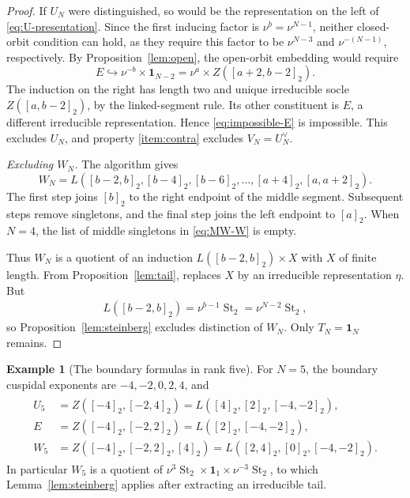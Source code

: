 \documentclass[11pt,leqno]{amsart}
\numberwithin{equation}{section}
\theoremstyle{plain}
\theoremstyle{definition}
\newtheorem{example}[theorem]{Example}
\theoremstyle{remark}
\DeclareMathOperator{\St}{St}
\newcommand{\one}{\mathbf{1}}
\newcommand{\into}{\hookrightarrow}
\newcommand{\seg}[2]{[#1,#2]_2}
\newcommand{\sg}[1]{[#1]_2}
\begin{document}
\begin{proof}
		If $U_N$ were distinguished, so would be the representation on
		the left of \eqref{eq:U-presentation}. 
		Since the first inducing factor is $\nu^b=\nu^{N-1}$,
		neither closed-orbit condition can hold, as they require this
		factor to be $\nu^{N-3}$ and $\nu^{-(N-1)}$, respectively.
		By Proposition~\ref{lem:open}, the open-orbit embedding would require
		\begin{equation}\label{eq:impossible-E}
			E\into\nu^{-b}\times\one_{N-2}
			=\nu^a\times Z(\seg{a+2}{b-2}).
		\end{equation}
		The induction on the right has length two and unique irreducible
		socle $Z(\seg a{b-2})$, by the linked-segment rule. 
		Its other constituent is $E$, a different irreducible representation.
		Hence \eqref{eq:impossible-E} is impossible.
		This excludes $U_N$, and property \ref{item:contra} excludes
		$V_N=U_N^\vee$.
		
		\smallskip
		\noindent\emph{Excluding $W_N$.}
		The algorithm gives
		\begin{equation}\label{eq:MW-W}
			W_N=L(\seg{b-2}b,\sg{b-4},\sg{b-6},\ldots,
			\sg{a+4},\seg a{a+2}).
		\end{equation}
		The first step joins $\sg b$ to the right endpoint of the middle
		segment. Subsequent steps remove singletons, and the final step joins
		the left endpoint to $\sg a$. When $N=4$, the list of middle
		singletons in \eqref{eq:MW-W} is empty.
		
		Thus $W_N$ is a quotient of an induction
		$L(\seg{b-2}b)\times X$ with $X$ of finite length.
		From Proposition~\ref{lem:tail}, replaces $X$ by an irreducible representation $\eta$.
		But
		\begin{align*}
			L(\seg{b-2}b)=\nu^{b-1}\St_2=\nu^{N-2}\St_2,
		\end{align*}
		so Proposition~\ref{lem:steinberg} excludes distinction of $W_N$.
		Only $T_N=\one_N$ remains.
	\end{proof}
	
	\begin{example}[The boundary formulas in rank five]
		For $N=5$, the boundary cuspidal exponents are
		$-4,-2,0,2,4$, and
		\begin{align*}
			\begin{aligned}
				U_5&=Z(\sg{-4},\seg{-2}4)
				=L(\sg4,\sg2,\seg{-4}{-2}),\\
				E&=Z(\sg{-4},\seg{-2}2)
				=L(\sg2,\seg{-4}{-2}),\\
				W_5&=Z(\sg{-4},\seg{-2}2,\sg4)
				=L(\seg24,\sg0,\seg{-4}{-2}).
			\end{aligned}
		\end{align*}
		In particular $W_5$ is a quotient of
		$\nu^3\St_2\times\one_1\times\nu^{-3}\St_2$, to which
		Lemma~\ref{lem:steinberg} applies after extracting an irreducible tail.
	\end{example}
	
\end{document}
